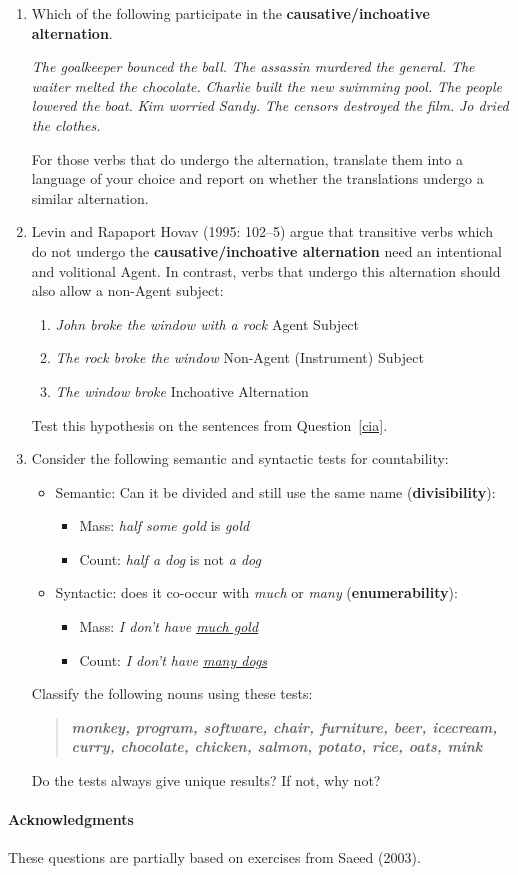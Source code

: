 \documentclass[a4paper]{article}
\newcommand{\lex}[1]{\textbf{\textit{#1}}}
\newcommand{\eng}[1]{\textit{#1}}
\newcommand{\ul}{\uline}
\begin{document}
\begin{enumerate}
\item  \label{cia} Which of the following participate in the
  \textbf{causative/inchoative alternation}.
  \begin{exe}
    \ex \textit{The goalkeeper bounced the ball.}
    \ex \textit{The assassin murdered the general.}
    \ex \textit{The waiter melted the chocolate.}
    \ex \textit{Charlie built the new swimming pool.}
    \ex \textit{The people lowered the boat.}
    \ex \textit{Kim worried Sandy.}
    \ex \textit{The censors destroyed the film.}
    \ex \textit{Jo dried the clothes.}
  \end{exe}
  For those verbs that do undergo the alternation, translate them
  into a language of your choice and report on whether the
  translations undergo a similar alternation.
\item Levin and Rapaport Hovav (1995: 102--5) argue that transitive
  verbs which do not undergo the \textbf{causative/inchoative
    alternation} need an intentional and volitional Agent.  In contrast,
  verbs that undergo this alternation should also allow a non-Agent subject:
  \begin{enumerate}
  \item \textit{John broke the window with a rock} \hfill Agent Subject
  \item \textit{The rock broke the window} \hfill Non-Agent (Instrument) Subject 
  \item \textit{The window broke} \hfill Inchoative Alternation
  \end{enumerate}
  Test this hypothesis on the sentences from Question~\ref{cia}.
\item Consider the following semantic and syntactic tests for countability:
  \begin{itemize}
  \item Semantic: Can it be divided and still use the same name 
    (\textbf{divisibility}):
    \begin{itemize}
    \item Mass:     \eng{half some gold} is \eng{gold}
    \item Count: \eng{half a dog} is not \eng{a dog} 
    \end{itemize}
  \item Syntactic: does it co-occur with \eng{much} or \eng{many}
    (\textbf{enumerability}):
    \begin{itemize}
    \item Mass:  \eng{I don't have \ul{much gold}}
    \item Count: \eng{I don't have \ul{many dogs}} 
    \end{itemize}
  \end{itemize}
  Classify the following nouns using these tests:
  \begin{quote}
    \lex{monkey, program, software, chair, furniture, 
      beer, icecream, curry, chocolate,
      chicken, salmon, potato, rice, oats, mink}
  \end{quote}
  Do the tests always give unique results?  If not, why not?
\end{enumerate}
\vfill
\paragraph{Acknowledgments} These questions are partially
based on exercises from Saeed (2003).
\end{document}
